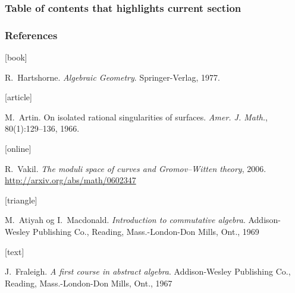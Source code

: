 \documentclass[9pt]{beamer}
\begin{document}
\begin{frame}
  \frametitle{Table of contents that highlights current section}

  \tableofcontents[currentsection]

\end{frame}

\hidelogo

\begin{frame}[allowframebreaks]
  \frametitle{References}

  \begin{thebibliography}{}

      [book]

      R.~Hartshorne.
      \newblock \emph{Algebraic Geometry}.
      \newblock Springer-Verlag, 1977.

      [article]

      M.~Artin.
      \newblock On isolated rational singularities of surfaces.
      \newblock \emph{Amer. J. Math.}, 80(1):129--136, 1966.

      [online]

      R.~Vakil.
      \newblock \emph{The moduli space of curves and Gromov--Witten theory}, 2006.
      \newblock \url{http://arxiv.org/abs/math/0602347}

      [triangle]

      M.~Atiyah og I.~Macdonald.
      \newblock \emph{Introduction to commutative algebra}.
      \newblock Addison-Wesley Publishing Co., Reading, Mass.-London-Don
      Mills, Ont., 1969

      [text]

      J.~Fraleigh.
      \newblock \emph{A first course in abstract algebra}.
      \newblock Addison-Wesley Publishing Co., Reading, Mass.-London-Don Mills, Ont., 1967

  \end{thebibliography}
\end{frame}
\end{document}
